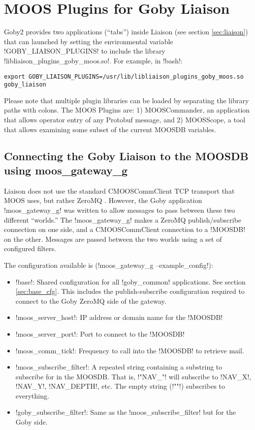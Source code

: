 \section{MOOS Plugins for Goby Liaison}\label{sec:moos_liaison} 

Goby2 provides two applications (``tabs'') inside Liaison (see section \ref{sec:liaison}) that can launched by setting the environmental variable !GOBY_LIAISON_PLUGINS! to include the library !libliaison_plugins_goby_moos.so!. For example, in !bash!:

\begin{verbatim}
export GOBY_LIAISON_PLUGINS=/usr/lib/libliaison_plugins_goby_moos.so
goby_liaison
\end{verbatim}

Please note that multiple plugin libraries can be loaded by separating the library paths with colons. The MOOS Plugins are: 1) MOOSCommander, an application that allows operator entry of any Protobuf message, and 2) MOOSScope, a tool that allows examining some subset of the current MOOSDB variables. 

\subsection{Connecting the Goby Liaison to the MOOSDB using moos\_gateway\_g}\label{sec:moos_gateway_g}

Liaison does not use the standard CMOOSCommClient TCP transport that MOOS uses, but rather ZeroMQ \cite{zmq}. However, the Goby application !moos_gateway_g! was written to allow messages to pass between these two different ``worlds.'' The !moos_gateway_g! makes a ZeroMQ publish/subscribe connection on one side, and a CMOOSCommClient connection to a !MOOSDB! on the other. Messages are passed between the two worlds using a set of configured filters.

The configuration available is (!moos_gateway_g --example_config!):

\resetbvlinenumber

\begin{itemize}
\item !base!: Shared configuration for all !goby_common! applications. See section \ref{sec:base_cfg}. This includes the publish-subscribe configuration required to connect to the Goby ZeroMQ side of the gateway.
\item !moos_server_host!: IP address or domain name for the !MOOSDB!
\item !moos_server_port!: Port to connect to the !MOOSDB!
\item !moos_comm_tick!: Frequency to call into the !MOOSDB! to retrieve mail.
\item !moos_subscribe_filter!: A repeated string containing a substring to subscribe for in the MOOSDB. That is, !"NAV_"! will subscribe to !NAV_X!, !NAV_Y!, !NAV_DEPTH!, etc. The empty string (!""!) subscribes to everything.
\item !goby_subscribe_filter!: Same as the !moos_subscribe_filter! but for the Goby side.
\end{itemize}


